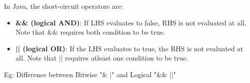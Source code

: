 
\begin{flushleft}
	
	 	In Java, the short-circuit operators are:
		\begin{itemize}
			\item \textbf{\&\& (logical AND)}: If LHS evaluates to false, RHS is not evaluated at all. Note that \&\& requires both condition to be true.
			
			\item \textbf{|| (logical OR)}: If the LHS evaluates to true, the RHS is not evaluated at all. Note that || requires atleast one condition to be true.
			
		\end{itemize}
		Eg:
		\bigskip
		Difference between Bitwise "\& |" and Logical "\&\&  ||" 
		
	
\end{flushleft}
\newpage